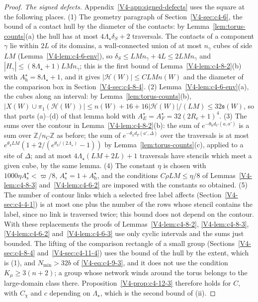 \documentclass[11pt]{article}
\numberwithin{equation}{section}
\theoremstyle{remark}
\theoremstyle{plain}
\begin{document}
\begin{proof}
\emph{The signed defects.} Appendix~\ref{V4-app:signed-defects} uses the square at the following places. (1) The geometry paragraph of Section~\ref{V4-sec:c4-6}, the bound of a contact hull by the diameter of the contacts: by Lemma~\ref{lem:torus-counts}(a) the hull has at most $4\Lambda_{\star}\delta_S+2$ traversals. The contacts of a component $\gamma$ lie within $2L$ of its domains, a wall-connected union of at most $n_{\gamma}$ cubes of side $LM$ (Lemma~\ref{V4-lem:c4-6-env}), so $\delta_S\leqslant LMn_{\gamma}+4L\leqslant 2LMn_{\gamma}$ and $| H_{\gamma}|\leqslant (8\Lambda_{\star}+1)LMn_{\gamma}$; this is the first bound of Lemma~\ref{V4-lem:c4-8-2}(b) with $A_{\mathrm h}^{\star}=8\Lambda_{\star}+1$, and it gives $|\mathcal H(W)|\leqslant CLMn(W)$ and the diameter of the comparison box in Section~\ref{V4-sec:c4-8-4}. (2) Lemma~\ref{V4-lem:c4-6-env}(a), the cubes along an interval: by Lemma~\ref{lem:torus-counts}(b), $| X(W)\cup\pi_1(\mathcal H(W))|\leqslant n(W)+16+16|\mathcal H(W)|/(LM)\leqslant 32\mathfrak s(W)$, so that parts (a)--(d) of that lemma hold with $A_E^{\star}= A_F^{\star}=32(2R_{\mathrm e}+1)^4$. (3) The sums over the contour in Lemma~\ref{V4-lem:c4-8-2}(b): the sum of $e^{-\theta_{\mathrm h}d_C(a,a')}$ is a sum over $\mathbb Z/n_C\mathbb Z$ as before; the sum of $e^{-\theta_{\mathrm x}d_T(a',\Delta)}$ over the traversals is at most $e^{\theta_{\mathrm x}LM}(1+2/(e^{\theta_{\mathrm x}/(2\Lambda_{\star})}-1))$ by Lemma~\ref{lem:torus-counts}(c), applied to a site of $\Delta$; and at most $4\Lambda_{\star}(LM+2L)+1$ traversals have stencils which meet a given cube, by the same lemma. (4) The constant $\eta$ is chosen with $1000\eta A_{\mathrm s}^{\star}<\varpi/8$, $A_{\mathrm s}^{\star}=1+A_{\mathrm h}^{\star}$, and the conditions $C\rho LM\leqslant \eta/8$ of Lemmas~\ref{V4-lem:c4-8-3} and~\ref{V4-lem:c4-6-2} are imposed with the constants so obtained. (5) The number of contour links which a selected free label affects (Section~\ref{V4-sec:c4-4-1}) is at most one plus the number of the rows whose stencil contains the label, since no link is traversed twice; this bound does not depend on the contour. With these replacements the proofs of Lemmas~\ref{V4-lem:c4-8-2}, \ref{V4-lem:c4-8-3}, \ref{V4-lem:c4-6-2} and~\ref{V4-lem:c4-6-3} use only cyclic intervals and the sums just bounded. The lifting of the comparison rectangle of a small group (Sections~\ref{V4-sec:c4-8-4} and~\ref{V4-sec:c4-11-4}) uses the bound of the hull by the extent, which is (1), and $N_{\min}>32b$ of \eqref{V4-eq:c4-9-3}, and it does not use the condition $K_{\mu}\geqslant 3(n+2)$; a group whose network winds around the torus belongs to the large-domain class there. Proposition~\ref{V4-prop:c4-12-3} therefore holds for $C$, with $C_{\chi}$ and $c$ depending on $\Lambda_{\star}$, which is the second bound of (ii).


\end{proof}
\end{document}
